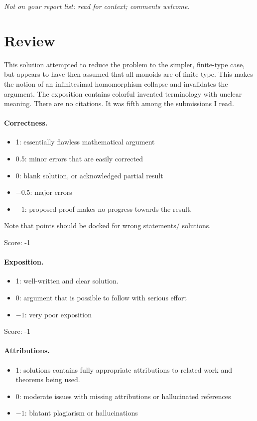 \documentclass[11pt]{article}
\theoremstyle{definition}
\begin{document}
\maketitle
\noindent\textit{Not on your report list: read for context; comments welcome.}

\section{Review}

This solution attempted to reduce the problem to the simpler, finite-type case, but appears to have then assumed that all monoids are of finite type.  This makes the notion of an infinitesimal homomorphism collapse and invalidates the argument.  The exposition contains colorful invented terminology with unclear meaning.  There are no citations.  It was fifth among the submissions I read.

\paragraph{Correctness.}
\begin{itemize}
	\item  1: essentially flawless mathematical argument
	\item  0.5: minor errors that are easily corrected
	\item  0: blank solution, or acknowledged partial result
	\item  $-0.5$: major errors
	\item  $-1$: proposed proof makes no progress towards the result.
\end{itemize}
Note that points should be docked for wrong statements/ solutions.

\noindent Score: -1

\paragraph{Exposition.}
\begin{itemize}
	\item  1: well-written and clear solution.
	\item  0: argument that is possible to follow with serious effort
	\item  $-1$: very poor exposition
\end{itemize}

\noindent Score: -1

\paragraph{Attributions.}
\begin{itemize}
	\item  1: solutions contains fully appropriate attributions
		to related work and theorems being used.
	\item  0: moderate issues with missing attributions or hallucinated references
	\item  $-1$: blatant plagiarism or hallucinations
\end{itemize}
\end{document}
